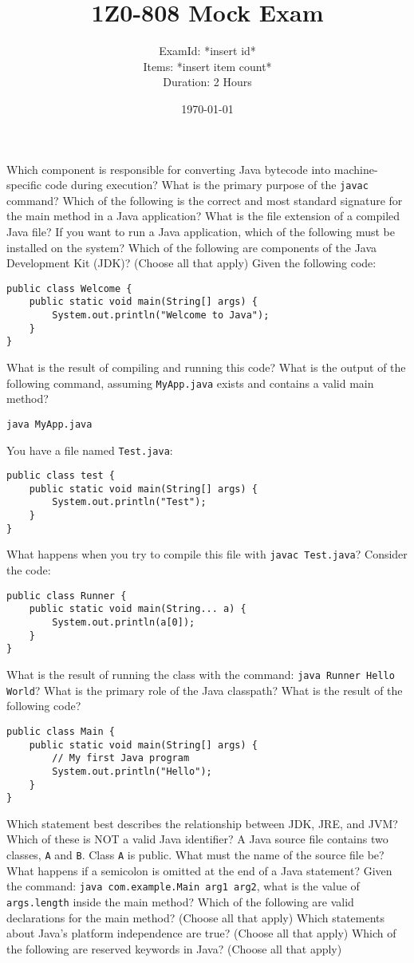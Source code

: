 \documentclass[12pt]{article}
\title{\textbf{1Z0-808 Mock Exam}}
\author{ExamId: *insert id* \\ Items: *insert item count* \\ Duration: 2 Hours}
\date{\today}
\begin{document}
\maketitle

Which component is responsible for converting Java bytecode into machine-specific code during execution?
What is the primary purpose of the \verb|javac| command?
Which of the following is the correct and most standard signature for the main method in a Java application?
What is the file extension of a compiled Java file?
If you want to run a Java application, which of the following must be installed on the system?
Which of the following are components of the Java Development Kit (JDK)? (Choose all that apply)
Given the following code:
\begin{verbatim}
public class Welcome {
    public static void main(String[] args) {
        System.out.println("Welcome to Java");
    }
}
\end{verbatim}
What is the result of compiling and running this code?
What is the output of the following command, assuming \verb|MyApp.java| exists and contains a valid main method?
\begin{verbatim}
java MyApp.java
\end{verbatim}
You have a file named \verb|Test.java|:
\begin{verbatim}
public class test {
    public static void main(String[] args) {
        System.out.println("Test");
    }
}
\end{verbatim}
What happens when you try to compile this file with \verb|javac Test.java|?
Consider the code:
\begin{verbatim}
public class Runner {
    public static void main(String... a) {
        System.out.println(a[0]);
    }
}
\end{verbatim}
What is the result of running the class with the command: \verb|java Runner Hello World|?
What is the primary role of the Java classpath?
What is the result of the following code?
\begin{verbatim}
public class Main {
    public static void main(String[] args) {
        // My first Java program
        System.out.println("Hello");
    }
}
\end{verbatim}
Which statement best describes the relationship between JDK, JRE, and JVM?
Which of these is NOT a valid Java identifier?
A Java source file contains two classes, \verb|A| and \verb|B|. Class \verb|A| is public. What must the name of the source file be?
What happens if a semicolon is omitted at the end of a Java statement?
Given the command: \verb|java com.example.Main arg1 arg2|, what is the value of \verb|args.length| inside the main method?
Which of the following are valid declarations for the main method? (Choose all that apply)
Which statements about Java's platform independence are true? (Choose all that apply)
Which of the following are reserved keywords in Java? (Choose all that apply)
\end{document}
